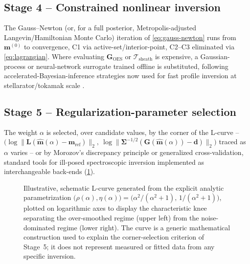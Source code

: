 \subsection{Stage 4 -- Constrained nonlinear inversion}

The Gauss--Newton (or, for a full posterior, Metropolis-adjusted Langevin/Hamiltonian Monte Carlo) iteration of \cref{eq:gauss-newton} runs from $\mathbf m^{(0)}$ to convergence, C1 via active-set/interior-point, C2--C3 eliminated via \cref{eq:lagrangian}. Where evaluating $\mathbf G_{\mathrm{OES}}$ or $\mathcal T_{\mathrm{sheath}}$ is expensive, a Gaussian-process or neural-network surrogate trained offline is substituted, following accelerated-Bayesian-inference strategies now used for fast profile inversion at stellarator/tokamak scale \cite{ref0728}.

\subsection{Stage 5 -- Regularization-parameter selection}

The weight $\alpha$ is selected, over candidate values, by the corner of the L-curve -- $\big(\log\|\mathbf L(\hat{\mathbf m}(\alpha)-\mathbf m_{\mathrm{ref}})\|_{2},\ \log\|\boldsymbol\Sigma^{-1/2}(\mathbf G(\hat{\mathbf m}(\alpha))-\mathbf d)\|_{2}\big)$ traced as $\alpha$ varies -- or by Morozov's discrepancy principle or generalized cross-validation, standard tools for ill-posed spectroscopic inversion \cite{ref0695} implemented as interchangeable back-ends (\cref{ch15-fig:lcurve}).

\begin{figure}[htbp]
\centering
{}
\caption{Illustrative, schematic L-curve generated from the explicit analytic parametrization $\big(\rho(\alpha),\eta(\alpha)\big)=\big(\alpha^{2}/(\alpha^{2}+1),\,1/(\alpha^{2}+1)\big)$, plotted on logarithmic axes to display the characteristic knee separating the over-smoothed regime (upper left) from the noise-dominated regime (lower right). The curve is a generic mathematical construction used to explain the corner-selection criterion of Stage~5; it does not represent measured or fitted data from any specific inversion.}
\label{ch15-fig:lcurve}
\end{figure}

